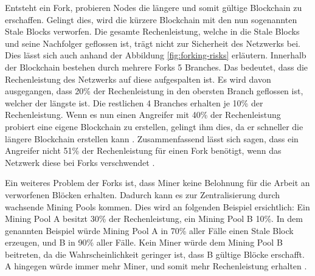 Entsteht ein Fork, probieren Nodes die längere und somit gültige Blockchain zu erschaffen. Gelingt dies, wird die kürzere Blockchain mit den nun sogenannten Stale Blocks verworfen. Die gesamte Rechenleistung, welche in die Stale Blocks und seine Nachfolger geflossen ist, trägt nicht zur Sicherheit des Netzwerks bei. Dies lässt sich auch anhand der Abbildung \ref{fig:forking-risks} erläutern. Innerhalb der Blockchain bestehen durch mehrere Forks 5 Branches. Das bedeutet, dass die Rechenleistung des Netzwerks auf diese aufgespalten ist. Es wird davon ausgegangen, dass 20\% der Rechenleistung in den obersten Branch geflossen ist, welcher der längste ist. Die restlichen 4 Branches erhalten je 10\% der Rechenleistung. Wenn es nun einen Angreifer mit 40\% der Rechenleistung probiert eine eigene Blockchain zu erstellen, gelingt ihm dies, da er schneller die längere Blockchain erstellen kann \cite{SompolinskyAcceleratingBitcoinTransaction2013}. Zusammenfassend lässt sich sagen, dass ein Angreifer nicht 51\% der Rechenleistung für einen Fork benötigt, wenn das Netzwerk diese bei Forks verschwendet \cite{Buterin12secondBlockTime2014}. 

Ein weiteres Problem der Forks ist, dass Miner keine Belohnung für die Arbeit an verworfenen Blöcken erhalten. Dadurch kann es zur Zentralisierung durch wachsende Mining Pools kommen. Dies wird an folgenden Beispiel ersichtlich: Ein Mining Pool A besitzt 30\% der Rechenleistung, ein Mining Pool B 10\%. In dem genannten Beispiel würde Mining Pool A in 70\% aller Fälle einen Stale Block erzeugen, und B in 90\% aller Fälle. Kein Miner würde dem Mining Pool B beitreten, da die Wahrscheinlichkeit geringer ist, dass B gültige Blöcke erschafft. A hingegen würde immer mehr Miner, und somit mehr Rechenleistung erhalten \cite{EthereumWhitepaper2017}.


